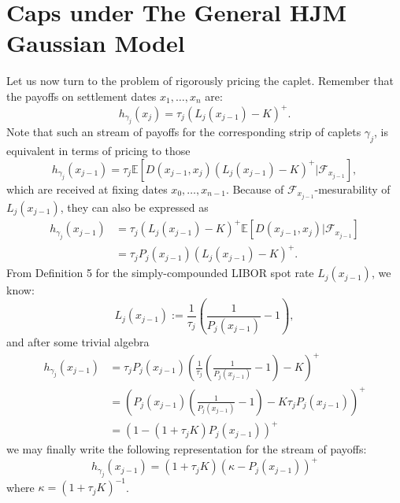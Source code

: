 \section{Caps under The General HJM Gaussian Model}
Let us now turn to the problem of rigorously pricing the
caplet. Remember that the payoffs on settlement dates $x_1, \dots,
x_n$ are: 
$$
h_{\gamma_j}(x_j) = \tau_j (L_j(x_{j-1})-K)^+.
$$
Note that such an stream of payoffs for the corresponding strip of caplets
$\gamma_j$, is equivalent in terms of pricing to those
$$
h_{\gamma_j}(x_{j-1})=\tau_j \mathbb{E} \left[D(x_{j-1},x_j)
  (L_j(x_{j-1})-K)^+\big| \mathcal{F}_{x_{j-1}}\right],
$$
which are received at fixing dates $x_0,\dots, x_{n-1}$. Because of
$\mathcal{F}_{x_{j-1}}$-mesurability of $L_j(x_{j-1})$, they can also
be expressed as
\begin{equation}
\begin{split}
h_{\gamma_j}(x_{j-1})&=\tau_j (L_j(x_{j-1})-K)^+ \mathbb{E}
\left[D(x_{j-1},x_j) 
  \big| \mathcal{F}_{x_{j-1}}\right]\\ &= \tau_j P_j(x_{j-1})
(L_j(x_{j-1})-K)^+. 
\end{split}
\end{equation}
From Definition 5 for the sim\-ply-\-com\-poun\-ded LIBOR spot rate
$L_j(x_{j-1})$, we know:
$$
L_j(x_{j-1}):=\frac{1}{\tau_j} \left( \frac{1}{P_j(x_{j-1})}-1\right),
$$
and after some trivial algebra \begin{equation}\begin{split}
h_{\gamma_j}(x_{j-1})& =\tau_j P_j(x_{j-1}) \left(\frac{1}{\tau_j}
  \left( \frac{1}{P_j(x_{j-1})}-1\right)-K\right)^+\\  
&=  \left(P_j(x_{j-1}) \left(\frac{1}{P_j(x_{j-1})}-1\right)-K
  \tau_jP_j(x_{j-1}) \right)^+ \\ 
&= \left(1-(1+\tau_j K)P_j(x_{j-1})\right)^+
\end{split}
\end{equation} we may finally write the following
representation for the stream of payoffs:
\begin{equation}
h_{\gamma_j}(x_{j-1})=(1+\tau_j K) \left(\kappa-P_j(x_{j-1})\right)^+
\end{equation}
where $\kappa=(1+\tau_j K)^{-1}$.


